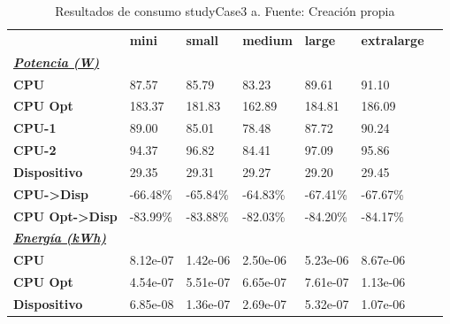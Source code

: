 \begin{table}[H]
    \centering
    \begin{tabular}{lllllll}
    \rowcolor[HTML]{DAE8FC} \ & \textbf{mini} & \textbf{small} & \textbf{medium} & \textbf{	large} & \textbf{	extralarge} \\
    \cellcolor[HTML]{DAE8FC} \textbf{\textbf{{\emph{{\underline{{Potencia (W)}}}}}}} &  &  &  & 	 & 	 \\
    \rowcolor[HTML]{EFEFEF} \cellcolor[HTML]{DAE8FC} \textbf{CPU} & 87.57 & 85.79 & 83.23 & 	89.61 & 	91.10 \\
    \cellcolor[HTML]{DAE8FC} \textbf{CPU Opt} & 183.37 & 181.83 & 162.89 & 	184.81 & 	186.09 \\
    \rowcolor[HTML]{EFEFEF} \cellcolor[HTML]{DAE8FC} \textbf{\quad CPU-1} & 89.00 & 85.01 & 78.48 & 	87.72 & 	90.24 \\
    \cellcolor[HTML]{DAE8FC} \textbf{\quad CPU-2} & 94.37 & 96.82 & 84.41 & 	97.09 & 	95.86 \\
    \rowcolor[HTML]{EFEFEF} \cellcolor[HTML]{DAE8FC} \textbf{Dispositivo} & 29.35 & 29.31 & 29.27 & 	29.20 & 	29.45 \\
    \cellcolor[HTML]{DAE8FC} \textbf{CPU->Disp} & -66.48\% & -65.84\% & -64.83\% & 	-67.41\% & 	-67.67\% \\
    \rowcolor[HTML]{EFEFEF} \cellcolor[HTML]{DAE8FC} \textbf{CPU Opt->Disp} & -83.99\% & -83.88\% & -82.03\% & 	-84.20\% & 	-84.17\% \\
    \cellcolor[HTML]{DAE8FC} \textbf{\textbf{{\emph{{\underline{{Energía (kWh)}}}}}}} &  &  &  & 	 & 	 \\
    \rowcolor[HTML]{EFEFEF} \cellcolor[HTML]{DAE8FC} \textbf{CPU} & 8.12e-07 & 1.42e-06 & 2.50e-06 & 	5.23e-06 & 	8.67e-06 \\
    \cellcolor[HTML]{DAE8FC} \textbf{CPU Opt} & 4.54e-07 & 5.51e-07 & 6.65e-07 & 	7.61e-07 & 	1.13e-06 \\
    \rowcolor[HTML]{EFEFEF} \cellcolor[HTML]{DAE8FC} \textbf{Dispositivo} & 6.85e-08 & 1.36e-07 & 2.69e-07 & 	5.32e-07 & 	1.07e-06 \\
    \end{tabular}
    \caption[Resultados de consumo studyCase3 a]{{Resultados de consumo studyCase3 a. Fuente: Creación propia}}
    \label{table_test_studyCase3_a_hw_powerResults}
\end{table}